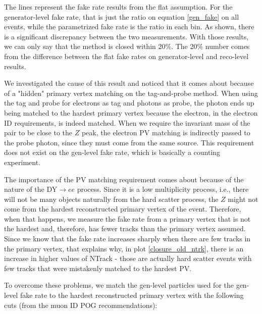 
The lines represent the fake rate results from the flat assumption. For the generator-level fake rate, that is just the ratio on equation \ref{gen_fake} on all events, while the parametrized fake rate is the ratio in each bin. As shown, there is a significant discrepancy between the two measurements. With those results, we can only say that the method is closed within 20\%. The 20\% number comes from the difference between the flat fake rates on generator-level and reco-level results.

We investigated the cause of this result and noticed that it comes about because of a "hidden" primary vertex matching on the tag-and-probe method. When using the tag and probe for electrons as tag and photons as probe, the photon ends up being matched to the hardest primary vertex because the electron, in the electron ID requirements, is indeed matched. When we require the invariant mass of the pair to be close to the $Z$ peak, the electron PV matching is indirectly passed to the probe photon, since they must come from the same source. This requirement does not exist on the gen-level fake rate, which is basically a counting experiment.

The importance of the PV matching requirement comes about because of the nature of the DY$\to ee$ process. Since it is a low multiplicity process, i.e., there will not be many objects naturally from the hard scatter process, the $Z$ might not come from the hardest reconstructed primary vertex of the event. Therefore, when that happens, we measure the fake rate from a  primary vertex that is not the hardest and, therefore, has fewer tracks than the primary vertex assumed. Since we know that the fake rate increases sharply when there are few tracks in the primary vertex, that explains why, in plot \ref{closure_old_ntrk}, there is an increase in higher values of NTrack - those are actually hard scatter events with few tracks that were mistakenly matched to the hardest PV.

To overcome these problems, we match the gen-level particles used for the gen-level fake rate to the hardest reconstructed primary vertex with the following cuts (from the muon ID POG recommendations):

